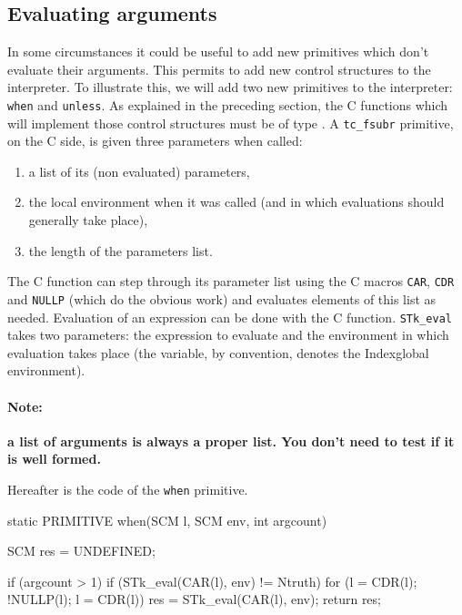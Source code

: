 \documentclass[10pt]{article}
\begin{document}
\subsection{Evaluating arguments}

In some circumstances it could be useful to add new primitives which don't
evaluate their arguments. This permits to add new control structures to the
interpreter. To illustrate this, we will add two new primitives to the {\stk}
interpreter: {\tt when} and {\tt unless}. As explained in the preceding
section, the C functions which will implement those control structures must be
of type . A {\tt tc\_fsubr} primitive, on the C
side, is given three parameters when called: 
\begin{enumerate}
\item a list of its (non evaluated) parameters, 
\item the local environment when it was called (and in which
evaluations should generally take place),
\item the length of the parameters list.
\end{enumerate}

The C function can step through its parameter list using the C macros
{\tt CAR}, {\tt CDR} and {\tt NULLP} (which do the obvious work) and evaluates elements
of this list as needed. Evaluation of an expression can be done with
the  C function. {\tt STk\_eval} takes two parameters: the
expression to evaluate and the environment in which evaluation takes
place (the  variable, by convention, denotes the Index{global environment}).

\paragraph*{Note:} {\bf a list of arguments is always a proper list. You don't need to test
if it is well formed.}

Hereafter is the code of the {\tt when} primitive.
\begin{Code}
\begin{listing}[200]{2}
static PRIMITIVE when(SCM l, SCM env, int argcount)
{
  SCM res = UNDEFINED;

  if (argcount > 1) {
    if (STk_eval(CAR(l), env) != Ntruth) {
      for (l = CDR(l); !NULLP(l); l = CDR(l)) {
        res = STk_eval(CAR(l), env);
      }
    }
  }
  return res;
}
\end{listing}
\end{Code}
\end{document}
